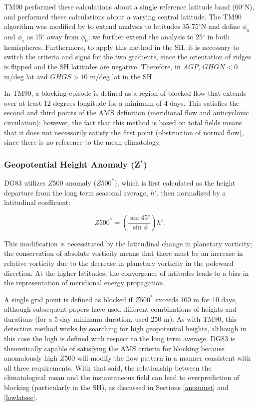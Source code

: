 \documentclass[smallextended]{svjour3}       %
\numberwithin{equation}{section}
\begin{document}
TM90 performed these calculations about a single reference latitude band (60$^\circ$N), and \cite{barnes_methodology_2012} performed these calculations about a varying central latitude. The TM90 algorithm was modified by \cite{scherrer_two-dimensional_2006} to extend analysis to latitudes 35-75$^\circ$N and define $\phi_n$ and $\phi_s$ as 15$^\circ$ away from $\phi_0$; we further extend the analysis to 25$^\circ$ in both hemispheres. Furthermore, to apply this method in the SH, it is necessary to switch the criteria and signs for the two gradients, since  the orientation of ridges is flipped and the SH latitudes are negative. Therefore, in $AGP$, $GHGN<0$ m/deg lat and $GHGS>10$ m/deg lat in the SH. 

In TM90, a blocking episode is defined as a region of blocked flow that extends over at least 12 degrees longitude for a minimum of 4 days. This satisfies the second and third points of the AMS definition (meridional flow and anticyclonic circulation); however, the fact that this method is based on total fields means that it does not necessarily satisfy the first point (obstruction of normal flow), since there is no reference to the mean climatology. 

\subsubsection{Geopotential Height Anomaly (Z$^\ast$)}\label{zanomdesc}

DG83 utilizes $Z500$ anomaly ($Z500^*$), which is first calculated as the height departure from the long term seasonal average, $h'$, then normalized by a latitudinal coefficient:

\begin{equation}
Z500^\ast = \left(\frac{\sin 45^\circ}{\sin \phi}\right)h'.
\end{equation}

\noindent This modification is necessitated by the latitudinal change in planetary vorticity; the conservation of absolute vorticity means that there must be an increase in relative vorticity due to the decrease in planetary vorticity in the poleward direction. At the higher latitudes, the convergence of latitudes leads to a bias in the representation of meridional energy propagation. 

A single grid point is defined as blocked if $Z500^*$ exceeds 100 m for 10 days, although subsequent papers have used different combinations of heights and durations (for a 5-day minimum duration, \cite{sausen_analysis_1995} used 250 m). As with TM90, this detection method works by searching for high geopotential heights, although in this case the high is defined with respect to the long term average. DG83 is theoretically capable of satisfying the AMS criteria for blocking because anomalously high $Z500$ will modify the flow pattern in a manner consistent with all three requirements. With that said, the relationship between the climatological mean and the instantaneous field can lead to overprediction of blocking (particularly in the SH), as discussed in Sections \ref{anominst} and \ref{lowlatsec}. 
\end{document}
